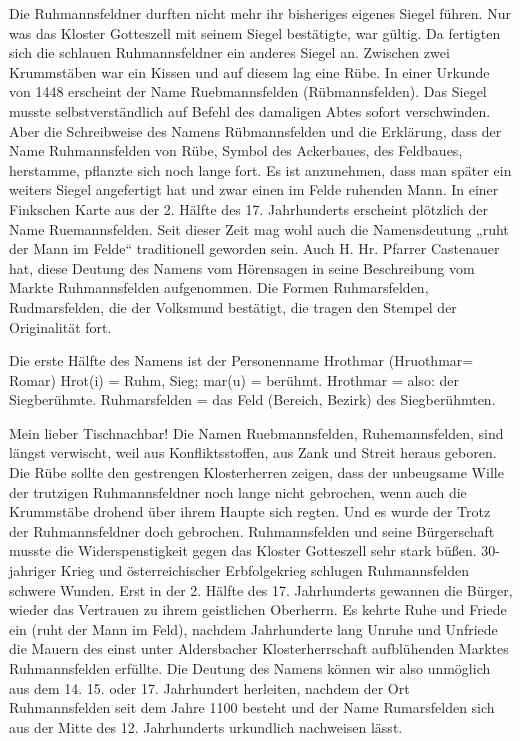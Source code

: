 \documentclass[12pt,a4paper]{book}
\begin{document}
Die Ruhmannsfeldner durften nicht mehr ihr bisheriges eigenes Siegel
führen. Nur was das Kloster Gotteszell mit seinem Siegel bestätigte, war
gültig. Da fertigten sich die schlauen Ruhmannsfeldner ein anderes
Siegel an. Zwischen zwei Krummstäben war ein Kissen und auf diesem lag
eine Rübe. In einer Urkunde von 1448 erscheint der Name Ruebmannsfelden
(Rübmannsfelden). Das Siegel musste selbstverständlich auf Befehl des
damaligen Abtes sofort verschwinden. Aber die Schreibweise des Namens
Rübmannsfelden und die Erklärung, dass der Name Ruhmannsfelden von Rübe,
Symbol des Ackerbaues, des Feldbaues, herstamme, pflanzte sich noch
lange fort. Es ist anzunehmen, dass man später ein weiters Siegel
angefertigt hat und zwar einen im Felde ruhenden Mann. In einer
Finkschen Karte aus der 2. Hälfte des 17. Jahrhunderts erscheint
plötzlich der Name Ruemannsfelden. Seit dieser Zeit mag wohl auch die
Namensdeutung „ruht der Mann im Felde“ traditionell geworden sein. Auch
H. Hr. Pfarrer Castenauer hat, diese Deutung des Namens vom Hörensagen
in seine Beschreibung vom Markte Ruhmannsfelden aufgenommen. Die Formen
Ruhmarsfelden, Rudmarsfelden, die der Volksmund bestätigt, die tragen
den Stempel der Originalität fort.

Die erste Hälfte des Namens ist der Personenname Hrothmar (Hruothmar=
Romar) Hrot(i) = Ruhm, Sieg; mar(u) = berühmt. Hrothmar = also: der
Siegberühmte. Ruhmarsfelden = das Feld (Bereich, Bezirk) des
Siegberühmten.

Mein lieber Tischnachbar! Die Namen Ruebmannsfelden, Ruhemannsfelden,
sind längst verwischt, weil aus Konfliktsstoffen, aus Zank und Streit
heraus geboren. Die Rübe sollte den gestrengen Klosterherren zeigen,
dass der unbeugsame Wille der trutzigen Ruhmannsfeldner noch lange nicht
gebrochen, wenn auch die Krummstäbe drohend über ihrem Haupte sich
regten. Und es wurde der Trotz der Ruhmannsfeldner doch gebrochen.
Ruhmannsfelden und seine Bürgerschaft musste die Widerspenstigkeit gegen
das Kloster Gotteszell sehr stark büßen. 30-jahriger Krieg und
österreichischer Erbfolgekrieg schlugen Ruhmannsfelden schwere Wunden.
Erst in der 2. Hälfte des 17. Jahrhunderts gewannen die Bürger, wieder
das Vertrauen zu ihrem geistlichen Oberherrn. Es kehrte Ruhe und Friede
ein (ruht der Mann im Feld), nachdem Jahrhunderte lang Unruhe und
Unfriede die Mauern des einst unter Aldersbacher Klosterherrschaft
aufblühenden Marktes Ruhmannsfelden erfüllte. Die Deutung des Namens
können wir also unmöglich aus dem 14. 15. oder 17. Jahrhundert
herleiten, nachdem der Ort Ruhmannsfelden seit dem Jahre 1100 besteht
und der Name Rumarsfelden sich aus der Mitte des 12. Jahrhunderts
urkundlich nachweisen lässt.
\end{document}

